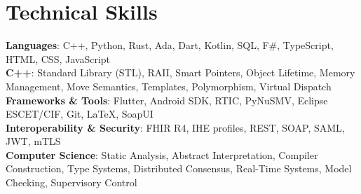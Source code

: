 \section{Technical Skills}
    \begin{itemize}[leftmargin=0.15in, label={}]
	\small{\item{
		\textbf{Languages}{: C++, Python, Rust, Ada, Dart, Kotlin, SQL, F\#, TypeScript, HTML, CSS, JavaScript} \\
		\textbf{C++}{: Standard Library (STL), RAII, Smart Pointers, Object Lifetime, Memory Management, Move Semantics, Templates, Polymorphism, Virtual Dispatch} \\
		\textbf{Frameworks \& Tools}{: Flutter, Android SDK, RTIC, PyNuSMV, Eclipse ESCET/CIF, Git, \LaTeX, SoapUI} \\
		\textbf{Interoperability \& Security}{: FHIR R4, IHE profiles, REST, SOAP, SAML, JWT, mTLS} \\
		\textbf{Computer Science}{: Static Analysis, Abstract Interpretation, Compiler Construction, Type Systems, Distributed Consensus, Real-Time Systems, Model Checking, Supervisory Control}
	}}
    \end{itemize}

